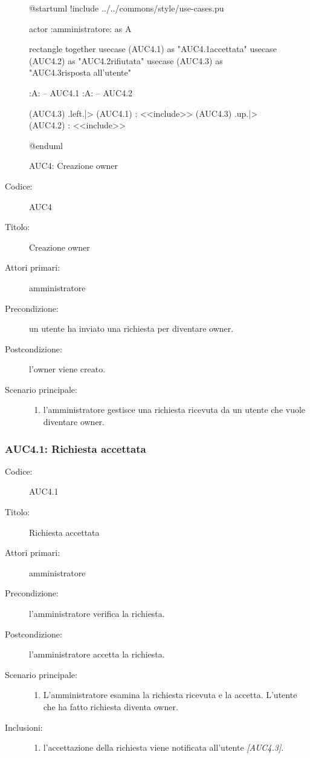 \documentclass[../../../analisi-dei-requisiti.tex]{subfiles}
\begin{document}
\begin{figure}[H]
  \centering
  \begin{plantuml}
  @startuml
  !include ../../commons/style/use-cases.pu

  actor :amministratore: as A

  rectangle {
    together {
      usecase (AUC4.1) as "AUC4.1\nRichiesta accettata"
      usecase (AUC4.2) as "AUC4.2\nRichiesta rifiutata"
    }
    usecase (AUC4.3) as "AUC4.3\nInvio risposta all'utente"
  }

  :A: -- AUC4.1
  :A: -- AUC4.2

  (AUC4.3) .left.|> (AUC4.1) : <<include>>
  (AUC4.3) .up.|> (AUC4.2) : <<include>>

  @enduml
  \end{plantuml}
  \caption{AUC4: Creazione owner}
  \label{fig:AUC4}
\end{figure}

\begin{description}
  \item[Codice:] AUC4
  \item[Titolo:] Creazione owner
  \item[Attori primari:] amministratore
  \item[Precondizione:] un utente ha inviato una richiesta per diventare owner.
  \item[Postcondizione:] l'owner viene creato.
  \item[Scenario principale:]
  \begin{enumerate}
    \item l'amministratore gestisce una richiesta ricevuta da un utente che vuole diventare owner.
  \end{enumerate}
\end{description}


\subsubsection{AUC4.1: Richiesta accettata}%
\label{subs:AUC4.1}

\begin{description}
  \item[Codice:] AUC4.1
  \item[Titolo:] Richiesta accettata
  \item[Attori primari:] amministratore
  \item[Precondizione:] l'amministratore verifica la richiesta.
  \item[Postcondizione:] l'amministratore accetta la richiesta.
  \item[Scenario principale:]
  \begin{enumerate}
    \item L'amministratore esamina la richiesta ricevuta e la accetta. L'utente che ha fatto richiesta diventa owner.
  \end{enumerate}
  \item[Inclusioni:]
  \begin{enumerate}
    \item l'accettazione della richiesta viene notificata all'utente \emph{[AUC4.3]}.
  \end{enumerate}
\end{description}
\end{document}
